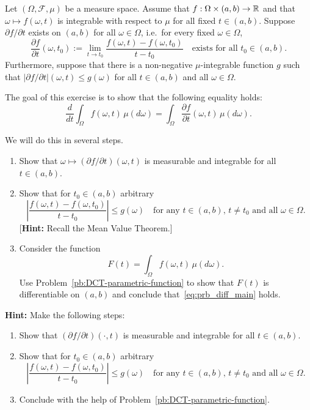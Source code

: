 \begin{problem}
		Let $(\Omega,\mathcal{F},\mu)$ be a measure space. Assume that $f:\Omega\times(a,b)\to\mathbb R$ and that $\omega\mapsto f(\omega,t)$ is integrable with respect to $\mu$ for all fixed $t\in(a,b)$. Suppose $\partial f/\partial t$ exists on $(a,b)$ for all $\omega\in \Omega$, i.e.\ for every fixed $\omega\in\Omega$,
		\[
			\frac{\partial f}{\partial t}(\omega, t_0):=\lim_{t\to t_0} \frac{f(\omega,t)-f(\omega,t_0)}{t-t_0} \quad\text{exists for all $t_0\in(a,b)$}.
		\]
		Furthermore, suppose that there is a non-negative $\mu$-integrable function $g$ such that $|\partial f/\partial t|(\omega,t)\le g(\omega)$ for all $t\in(a,b)$ and all $\omega\in\Omega$. 
		
		The goal of this exercise is to show that the following equality holds:
		\begin{equation}\label{eq:prb_diff_main}
			\frac{d}{dt}\int_\Omega f(\omega,t)\,\mu(d\omega) = \int_\Omega \frac{\partial f}{\partial t}(\omega,t)\,\mu(d\omega).
		\end{equation}
		
		We will do this in several steps.
		\begin{enumerate}[label={(\alph*)}]
			\item Show that $\omega \mapsto (\partial f/\partial t)(\omega,t)$ is measurable and integrable for all $t\in(a,b)$.
			\item Show that for $t_0\in(a,b)$ arbitrary
			\[
				\left|\frac{f(\omega,t)-f(\omega,t_0)}{t-t_0}\right| \le g(\omega)\quad\text{for any $t\in(a,b)$, $t\ne t_0$ and all $\omega\in\Omega$.}
			\]
			[\textbf{Hint:} Recall the Mean Value Theorem.]
			\item Consider the function
			\[
				F(t) = \int_\Omega f(\omega,t)\,\mu(d\omega).
			\] 
			Use Problem~\ref{pb:DCT-parametric-function} to show that $F(t)$ is differentiable on $(a,b)$ and conclude that~\eqref{eq:prb_diff_main} holds.
		\end{enumerate}		
		
		\smallskip
		
		\noindent\textbf{Hint:} Make the following steps:
		\begin{enumerate}[label={(\arabic*)}]
			\item Show that $(\partial f/\partial t)(\cdot,t)$ is measurable and integrable for all $t\in(a,b)$.
			\item Show that for $t_0\in(a,b)$ arbitrary
			\[
				\left|\frac{f(\omega,t)-f(\omega,t_0)}{t-t_0}\right| \le g(\omega)\quad\text{for any $t\in(a,b)$, $t\ne t_0$ and all $\omega\in\Omega$.}
			\]
			\item Conclude with the help of Problem~\ref{pb:DCT-parametric-function}.
		\end{enumerate}
\end{problem}

